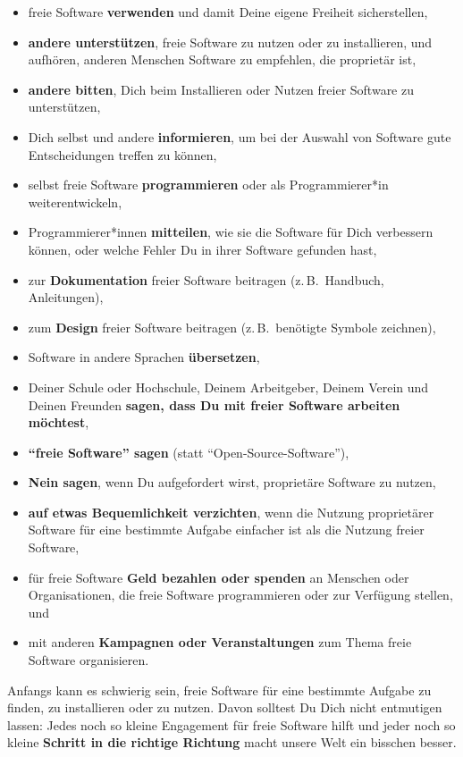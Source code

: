 \documentclass[a5paper,12pt]{scrartcl}
\begin{document}
\begin{itemize}
\item freie Software \textbf{verwenden} und damit Deine eigene
  Freiheit sicherstellen,
\item \textbf{andere unterstützen}, freie Software zu nutzen oder zu
  installieren, und aufhören, anderen Menschen Software zu empfehlen,
  die proprietär ist,
\item \textbf{andere bitten}, Dich beim Installieren oder Nutzen
  freier Software zu unterstützen,
\item Dich selbst und andere \textbf{informieren}, um bei der Auswahl
  von Software gute Entscheidungen treffen zu können,
\item selbst freie Software \textbf{programmieren} oder als
  Programmierer*in weiterentwickeln,
\item Programmierer*innen \textbf{mitteilen}, wie sie die Software für
  Dich verbessern können, oder welche Fehler Du in ihrer Software
  gefunden hast,
\item zur \textbf{Dokumentation} freier Software beitragen (z.\,B.\
  Handbuch, Anleitungen),
\item zum \textbf{Design} freier Software beitragen (z.\,B.\ benötigte
  Symbole zeichnen),
\item Software in andere Sprachen \textbf{übersetzen},
\item Deiner Schule oder Hochschule, Deinem Arbeitgeber, Deinem Verein
  und Deinen Freunden \textbf{sagen, dass Du mit freier Software
  arbeiten möchtest},
\item \textbf{"`freie Software"' sagen} (statt
  "`Open-Source-Software"'),
\item \textbf{Nein sagen}, wenn Du aufgefordert wirst, proprietäre
  Software zu nutzen,
\item \textbf{auf etwas Bequemlichkeit verzichten}, wenn die Nutzung
  proprietärer Software für eine bestimmte Aufgabe einfacher ist als
  die Nutzung freier Software,
\item für freie Software \textbf{Geld bezahlen oder spenden} an
  Menschen oder Organisationen, die freie Software programmieren oder
  zur Verfügung stellen, und
\item mit anderen \textbf{Kampagnen oder Veranstaltungen} zum Thema
  freie Software organisieren.
\end{itemize}

Anfangs kann es schwierig sein, freie Software für eine bestimmte
Aufgabe zu finden, zu installieren oder zu nutzen. Davon solltest Du
Dich nicht entmutigen lassen: Jedes noch so kleine Engagement für
freie Software hilft und jeder noch so kleine \textbf{Schritt in die
  richtige Richtung} macht unsere Welt ein bisschen besser.
\end{document}
